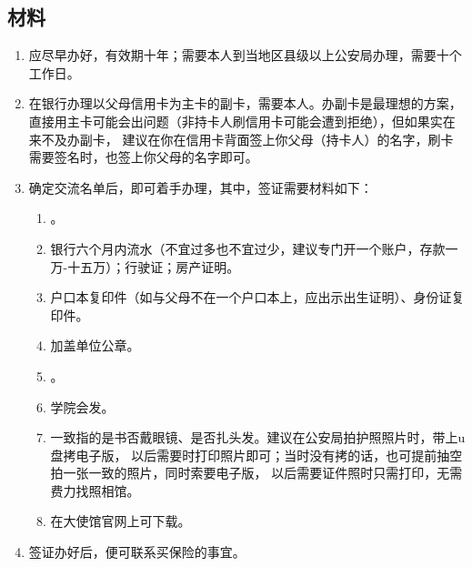 \subsection{材料}
\begin{enumerate}
    \item {}应尽早办好，有效期十年；需要本人到当地区县级以上公安局办理，需要十个工作日。
    \item {}在银行办理以父母信用卡为主卡的副卡，需要本人。办副卡是最理想的方案，
                        直接用主卡可能会出问题（非持卡人刷信用卡可能会遭到拒绝），但如果实在来不及办副卡，
                        建议在你在信用卡背面签上你父母（持卡人）的名字，刷卡需要签名时，也签上你父母的名字即可。
    \item {}确定交流名单后，即可着手办理，其中，签证需要材料如下：
        \begin{enumerate}[(1)]
            \item {}。
            \item {}银行六个月内流水（不宜过多也不宜过少，建议专门开一个账户，存款一万-十五万）；行驶证；房产证明。
            \item {}户口本复印件（如与父母不在一个户口本上，应出示出生证明）、身份证复印件。
            \item {}加盖单位公章。
            \item {}。
            \item {}学院会发。
            \item {}一致指的是书否戴眼镜、是否扎头发。建议在公安局拍护照照片时，带上u盘拷电子版，
                        以后需要时打印照片即可；当时没有拷的话，也可提前抽空拍一张一致的照片，同时索要电子版，
                        以后需要证件照时只需打印，无需费力找照相馆。
            \item {}在大使馆官网上可下载。
        \end{enumerate}
    \item {}签证办好后，便可联系买保险的事宜。
\end{enumerate}


